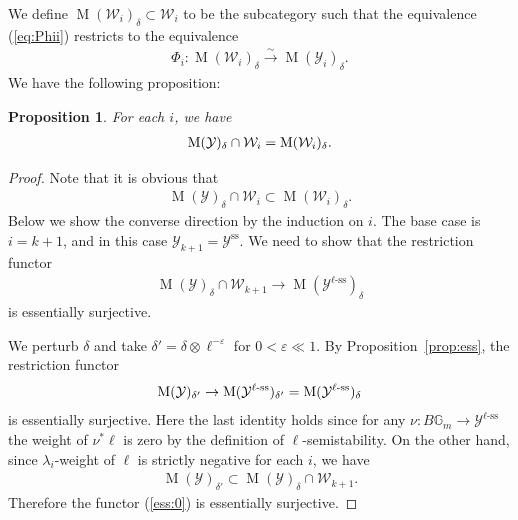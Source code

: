 \documentclass [11pt,oneside,a4paper,mathscr]{amsart}
\newtheorem{prop}[thm]{Proposition}
\theoremstyle{definition}
\newcommand{\Y}{\mathcal{Y}}
\newcommand{\MM}{\operatorname{M}}
\newcommand{\bgm}{B\mathbb{G}_m}
\begin{document}
We define $\MM(\mathcal{W}_i)_{\delta} \subset \mathcal{W}_i$ 
to be the subcategory such that the equivalence (\ref{eq:Phii}) restricts 
to the equivalence 
\begin{align*}
    \Phi_i \colon \MM(\mathcal{W}_i)_{\delta} \stackrel{\sim}{\to} \MM(\Y_i)_{\delta}. 
\end{align*}
We have the following proposition: 
\begin{prop}\label{prop:QBW}
    For each $i$, we have 
    \begin{align}\notag
    \MM(\Y)_{\delta} \cap \mathcal{W}_i=\MM(\mathcal{W}_i)_{\delta}.         
    \end{align}
\end{prop}
\begin{proof}
    Note that it is obvious that 
    \begin{align}\label{inc:obv}
\MM(\Y)_{\delta} \cap \mathcal{W}_i \subset \MM(\mathcal{W}_i)_{\delta}. 
    \end{align}
    Below we show the converse direction by the induction on 
    $i$. The base case is $i=k+1$, and in this case $\mathcal{Y}_{k+1}=\mathcal{Y}^{\mathrm{ss}}$. 
    We need to show that the restriction functor 
    \begin{align}\label{ess:0}
        \MM(\Y)_{\delta} \cap \mathcal{W}_{k+1} \to \MM(\Y^{\ell\text{-ss}})_{\delta}
    \end{align}
    is essentially surjective. 
    
    We perturb $\delta$ and take 
    $\delta'=\delta \otimes \ell^{-\varepsilon}$ for $0<\varepsilon \ll 1$. 
    By Proposition~\ref{prop:ess}, the restriction functor 
    \begin{align}\notag
\MM(\Y)_{\delta'} \to \MM(\Y^{\ell\text{-ss}})_{\delta'}=\MM(\Y^{\ell\text{-ss}})_{\delta}
    \end{align}
    is essentially surjective. Here the 
    last identity holds since for any $\nu \colon \bgm \to \Y^{\ell\text{-ss}}$ 
the weight of $\nu^{\ast}\ell$ is zero by the definition of $\ell$-semistability. 
On the other hand, since $\lambda_i$-weight of $\ell$ is strictly negative for each $i$, 
we have 
\begin{align*}
    \MM(\Y)_{\delta'} \subset \MM(\Y)_{\delta} \cap \mathcal{W}_{k+1}. 
\end{align*}
Therefore the functor (\ref{ess:0}) is essentially surjective. 


\end{proof}
\end{document}
